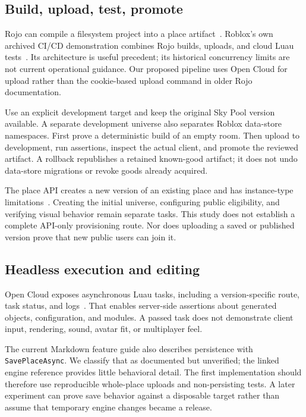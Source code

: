 \documentclass[10pt,letterpaper,twocolumn]{article}
\begin{document}
\subsection{Build, upload, test, promote}
Rojo can compile a filesystem project into a place artifact~\cite{rojo}. Roblox's own archived CI/CD demonstration combines Rojo builds, uploads, and cloud Luau tests~\cite{cicd}. Its architecture is useful precedent; its historical concurrency limits are not current operational guidance. Our proposed pipeline uses Open Cloud for upload rather than the cookie-based upload command in older Rojo documentation.

Use an explicit development target and keep the original Sky Pool version available. A separate development universe also separates Roblox data-store namespaces. First prove a deterministic build of an empty room. Then upload to development, run assertions, inspect the actual client, and promote the reviewed artifact. A rollback republishes a retained known-good artifact; it does not undo data-store migrations or revoke goods already acquired.

The place API creates a new version of an existing place and has instance-type limitations~\cite{publishing}. Creating the initial universe, configuring public eligibility, and verifying visual behavior remain separate tasks. This study does not establish a complete API-only provisioning route. Nor does uploading a saved or published version prove that new public users can join it.

\subsection{Headless execution and editing}
Open Cloud exposes asynchronous Luau tasks, including a version-specific route, task status, and logs~\cite{luau}. That enables server-side assertions about generated objects, configuration, and modules. A passed task does not demonstrate client input, rendering, sound, avatar fit, or multiplayer feel.

The current Markdown feature guide also describes persistence with \texttt{SavePlaceAsync}. We classify that as documented but unverified; the linked engine reference provides little behavioral detail. The first implementation should therefore use reproducible whole-place uploads and non-persisting tests. A later experiment can prove save behavior against a disposable target rather than assume that temporary engine changes became a release.
\end{document}
